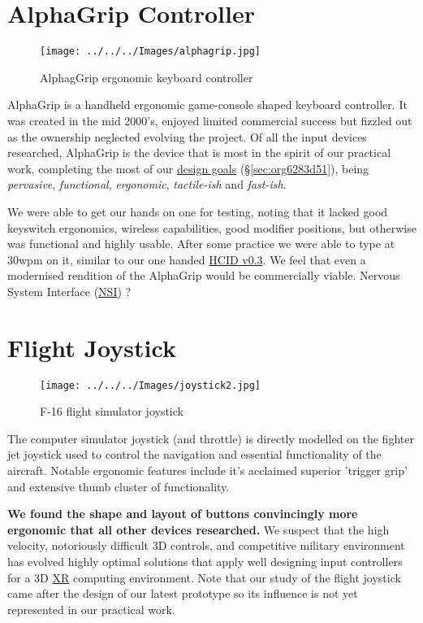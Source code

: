 \documentclass[logo,bsc,singlespacing,parskip]{infthesis}
\begin{document}
\chapter{AlphaGrip Controller}
\label{sec:orgd782f4d}
\begin{figure}[h]
\centering
\texttt{[image: ../../../Images/alphagrip.jpg]}
\caption{AlphagGrip ergonomic keyboard controller}
\end{figure}

AlphaGrip is a handheld ergonomic game-console shaped keyboard controller.
It was created in the mid 2000's, enjoyed limited commercial success but fizzled out as the ownership neglected evolving the project.
Of all the input devices researched, AlphaGrip is the device that is most in the spirit of our practical work, completing the most of our \hyperref[sec:org6283d51]{design goals} (\S \ref{sec:org6283d51}), being \emph{pervasive}, \emph{functional}, \emph{ergonomic}, \emph{tactile-ish} and \emph{fast-ish}.

We were able to get our hands on one for testing, noting that it lacked good keyswitch ergonomics, wireless capabilities, good modifier positions, but otherwise was functional and highly usable.
After some practice we were able to type at 30wpm on it, similar to our one handed \hyperref[sec:org0f71899]{HCID v0.3}.
We feel that even a modernised rendition of the AlphaGrip would be commercially viable.
Nervous System Interface (\hyperref[org559faaa]{NSI}) ?
\chapter{Flight Joystick}
\label{sec:org49ebdb8}
\begin{figure}[h]
\centering
\texttt{[image: ../../../Images/joystick2.jpg]}
\caption{F-16 flight simulator joystick}
\end{figure}

The computer simulator joystick (and throttle) is directly modelled on the fighter jet joystick used to control the navigation and essential functionality of the aircraft.
Notable ergonomic features include it's acclaimed superior 'trigger grip' and extensive thumb cluster of functionality.

\textbf{We found the shape and  layout of buttons convincingly more ergonomic that all other devices researched.}
We suspect that the high velocity, notoriously difficult 3D controls, and competitive military environment has evolved highly optimal solutions that apply well designing input controllers for a 3D \hyperref[org88b0f70]{XR} computing environment.
Note that our study of the flight joystick came after the design of our latest prototype so its influence is not yet represented in our practical work.
\end{document}
